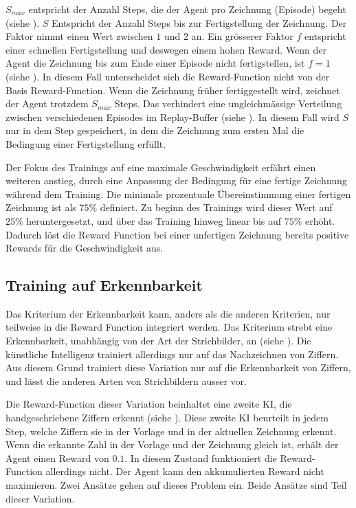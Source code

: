 $S_{max}$ entspricht der Anzahl Steps, die der Agent pro Zeichnung (Episode)
begeht (siehe ). $S$ Entspricht der Anzahl Steps
bis zur Fertigstellung der Zeichnung. Der Faktor nimmt einen Wert zwischen $1$
und $2$ an. Ein grösserer Faktor $f$ entspricht einer schnellen Fertigstellung
und deswegen einem hohen Reward. Wenn der Agent die Zeichnung bis zum Ende einer
Episode nicht fertigstellen, ist $f = 1$ (siehe ). In
diesem Fall unterscheidet sich die Reward-Function nicht von der Basis
Reward-Function. Wenn die Zeichnung früher fertiggestellt wird, zeichnet der
Agent trotzdem $S_{max}$ Steps. Das verhindert eine ungleichmässige Verteilung
zwischen verschiedenen Episodes im Replay-Buffer (siehe ).
In diesem Fall wird $S$ nur in dem Step gespeichert, in dem die Zeichnung zum
ersten Mal die Bedingung einer Fertigstellung erfüllt.   

Der Fokus des Trainings auf eine maximale Geschwindigkeit erfährt einen weiteren
anstieg, durch eine Anpassung der Bedingung für eine fertige Zeichnung während
dem Training. Die minimale prozentuale Übereinstimmung einer fertigen Zeichnung
ist als $75\%$ definiert. Zu beginn des Trainings wird dieser Wert auf $25\%$  %
heruntergesetzt, und über das Training hinweg linear bis auf $75\%$ erhöht.
Dadurch löst die Reward Function bei einer unfertigen Zeichnung bereits positive
Rewards für die Geschwindigkeit aus.


\subsection{Training auf Erkennbarkeit}
\label{sub:m_var_rec}
Das Kriterium der Erkennbarkeit kann, anders als die anderen Kriterien, nur
teilweise in die Reward Function integriert werden. Das Kriterium strebt eine
Erkennbarkeit, unabhängig von der Art der Strichbilder, an (siehe
). Die künstliche Intelligenz trainiert allerdings nur
auf das Nachzeichnen von Ziffern. Aus diesem Grund trainiert diese Variation nur
auf die Erkennbarkeit von Ziffern, und lässt die anderen Arten von Strichbildern
ausser vor. 

Die Reward-Function dieser Variation beinhaltet eine zweite KI, die
handgeschriebene Ziffern erkennt (siehe ). Diese zweite KI
beurteilt in jedem Step, welche Ziffern sie in der Vorlage und in der aktuellen  %
Zeichnung erkennt. Wenn die erkannte Zahl in der Vorlage und der Zeichnung
gleich ist, erhält der Agent einen Reward von $0.1$. In diesem Zustand
funktioniert die Reward-Function allerdings nicht. Der Agent
kann den akkumulierten Reward nicht maximieren. Zwei Ansätze gehen auf dieses
Problem ein. Beide Ansätze sind Teil dieser Variation.

